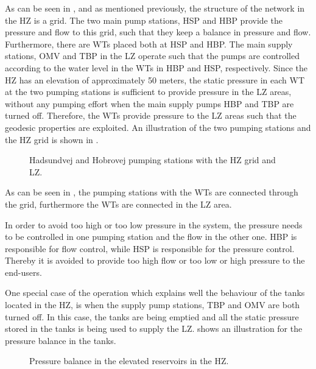 As can be seen in , and as mentioned previously, the structure of the network in the HZ is a grid. The two main pump stations, HSP and HBP provide the pressure and flow to this grid, such that they keep a balance in pressure and flow. Furthermore, there are WTs placed both at HSP and HBP. The main supply stations, OMV and TBP in the LZ operate such that the pumps are controlled according to the water level in the WTs in HBP and HSP, respectively. Since the HZ has an elevation of approximately 50 meters, the static pressure in each WT at the two pumping stations is sufficient to provide pressure in the LZ areas, without any pumping effort when the main supply pumps HBP and TBP are turned off. Therefore, the WTs provide pressure to the LZ areas such that the geodesic properties are exploited. An illustration of the two pumping stations and the HZ grid is shown in . 

\begin{figure}[H]
\centering

\caption{Hadsundvej and Hobrovej pumping stations with the HZ grid and LZ.}
\label{fig:HBP_HSP_grid}
\end{figure}

\vspace{-3mm}

As can be seen in , the pumping stations with the WTs are connected through the grid, furthermore the WTs are connected in the LZ area.

In order to avoid too high or too low pressure in the system, the pressure needs to be controlled in one pumping station and the flow in the other one. HBP is responsible for flow control, while HSP is responsible for the pressure control. Thereby it is avoided to provide too high flow or too low or high pressure to the end-users. 

One special case of the operation which explains well the behaviour of the tanks located in the HZ, is when the supply pump stations, TBP and OMV are both turned off. In this case, the tanks are being emptied and all the static pressure stored in the tanks is being used to supply the LZ.  shows an illustration for the pressure balance in the tanks.

\begin{figure}[H]
\centering

\caption{Pressure balance in the elevated reservoirs in the HZ. }
\label{fig:pressure_balance_Randers}
\end{figure}

